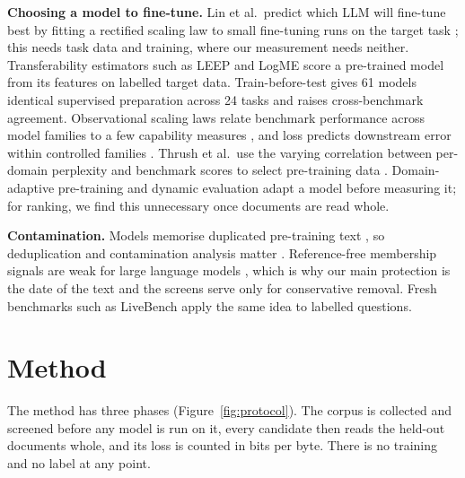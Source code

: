 \documentclass[10pt]{article}
\begin{document}
\textbf{Choosing a model to fine-tune.} Lin et al.\ predict which LLM will fine-tune best by fitting
a rectified scaling law to small fine-tuning runs on the target task \citep{lin2024rectified}; this
needs task data and training, where our measurement needs neither. Transferability estimators such
as LEEP and LogME \citep{nguyen2020leep,you2021logme} score a pre-trained model from its features on
labelled target data. Train-before-test \citep{zhang2025trainbeforetest} gives 61 models identical
supervised preparation across 24 tasks and raises cross-benchmark agreement. Observational scaling
laws relate benchmark performance across model families to a few capability measures
\citep{ruan2024observational}, and loss predicts downstream error within controlled families
\citep{gadre2025scales}. Thrush et al.\ use the varying correlation between per-domain perplexity
and benchmark scores to select pre-training data \citep{thrush2024perplexity}. Domain-adaptive
pre-training \citep{gururangan2020dapt} and dynamic evaluation \citep{krause2018dynamic} adapt a
model before measuring it; for ranking, we find this unnecessary once documents are read whole.

\textbf{Contamination.} Models memorise duplicated pre-training text
\citep{carlini2021extracting,carlini2023quantifying}, so deduplication and contamination analysis
matter \citep{lee2022deduplicating,xu2024survey}. Reference-free membership signals
\citep{shi2024mink,zhang2025minkpp} are weak for large language models
\citep{duan2024mia}, which is why our main protection is the date of the text and the screens serve
only for conservative removal. Fresh benchmarks such as LiveBench \citep{white2025livebench} apply
the same idea to labelled questions.

\section{Method}
\label{sec:protocol}
The method has three phases (Figure~\ref{fig:protocol}). The corpus is collected and screened
before any model is run on it, every candidate then reads the held-out documents whole, and its
loss is counted in bits per byte. There is no training and no label at any point.
\end{document}
